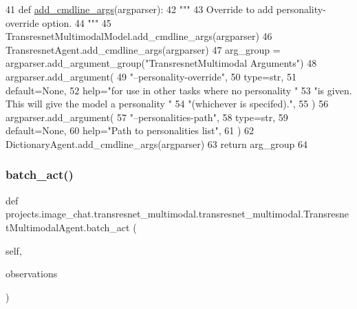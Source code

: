 \begin{DoxyCode}
41     \textcolor{keyword}{def }\hyperlink{namespaceparlai_1_1agents_1_1drqa_1_1config_a62fdd5554f1da6be0cba185271058320}{add\_cmdline\_args}(argparser):
42         \textcolor{stringliteral}{"""}
43 \textcolor{stringliteral}{        Override to add personality-override option.}
44 \textcolor{stringliteral}{        """}
45         TransresnetMultimodalModel.add\_cmdline\_args(argparser)
46         TransresnetAgent.add\_cmdline\_args(argparser)
47         arg\_group = argparser.add\_argument\_group(\textcolor{stringliteral}{"TransresnetMultimodal Arguments"})
48         argparser.add\_argument(
49             \textcolor{stringliteral}{"--personality-override"},
50             type=str,
51             default=\textcolor{keywordtype}{None},
52             help=\textcolor{stringliteral}{"for use in other tasks where no personality "}
53             \textcolor{stringliteral}{"is given. This will give the model a personality "}
54             \textcolor{stringliteral}{"(whichever is specifed)."},
55         )
56         argparser.add\_argument(
57             \textcolor{stringliteral}{"--personalities-path"},
58             type=str,
59             default=\textcolor{keywordtype}{None},
60             help=\textcolor{stringliteral}{"Path to personalities list"},
61         )
62         DictionaryAgent.add\_cmdline\_args(argparser)
63         \textcolor{keywordflow}{return} arg\_group
64 
\end{DoxyCode}
\mbox{\label{classprojects_1_1image__chat_1_1transresnet__multimodal_1_1transresnet__multimodal_1_1TransresnetMultimodalAgent_a446c248cfc8d115d4944fcddb3bd05cf}} 
\subsubsection{\texorpdfstring{batch\+\_\+act()}{batch\_act()}}
{\footnotesize\ttfamily def projects.\+image\+\_\+chat.\+transresnet\+\_\+multimodal.\+transresnet\+\_\+multimodal.\+Transresnet\+Multimodal\+Agent.\+batch\+\_\+act (\begin{DoxyParamCaption}\item[{}]{self,  }\item[{}]{observations }\end{DoxyParamCaption})}

